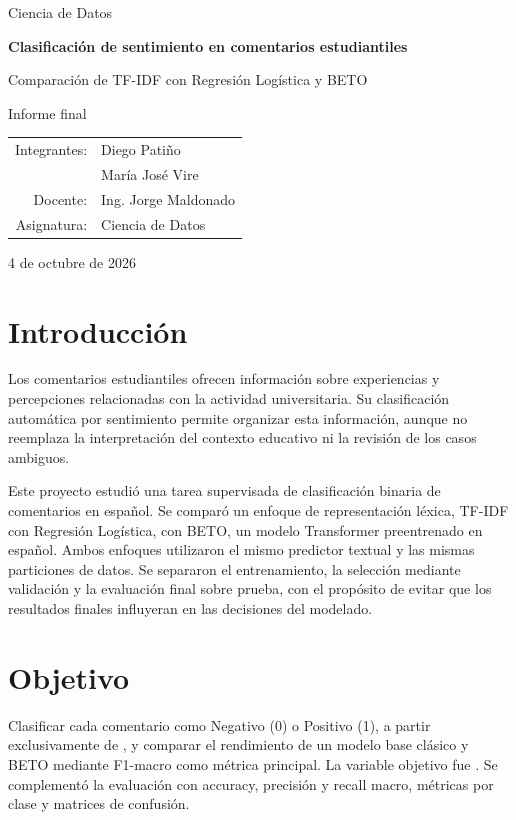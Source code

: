 \documentclass[11pt,a4paper]{article}
\newcommand{\code}[1]{\texttt{\detokenize{#1}}}
\begin{document}
\hypersetup{pageanchor=false}
\begin{titlepage}
\centering
\vspace*{2cm}
{\Large Ciencia de Datos\par}
\vspace{1.6cm}
{\LARGE\bfseries Clasificación de sentimiento en comentarios estudiantiles\par}
\vspace{0.7cm}
{\large Comparación de TF-IDF con Regresión Logística y BETO\par}
\vspace{1.5cm}
{\large Informe final\par}
\vfill
\begin{tabular}{rl}
Integrantes: & Diego Patiño\\
 & María José Vire\\[0.7em]
Docente: & Ing. Jorge Maldonado\\[0.7em]
Asignatura: & Ciencia de Datos
\end{tabular}
\vspace{1.5cm}
\par 4 de octubre de 2026
\vspace*{1cm}
\end{titlepage}
\hypersetup{pageanchor=true}

\section{Introducción}
Los comentarios estudiantiles ofrecen información sobre experiencias y percepciones
relacionadas con la actividad universitaria. Su clasificación automática por sentimiento
permite organizar esta información, aunque no reemplaza la interpretación del contexto
educativo ni la revisión de los casos ambiguos.

Este proyecto estudió una tarea supervisada de clasificación binaria de comentarios en
español. Se comparó un enfoque de representación léxica, TF-IDF con Regresión Logística,
con BETO, un modelo Transformer preentrenado en español. Ambos enfoques utilizaron el
mismo predictor textual y las mismas particiones de datos. Se separaron el entrenamiento,
la selección mediante validación y la evaluación final sobre prueba, con el propósito
de evitar que los resultados finales influyeran en las decisiones del modelado.

\section{Objetivo}
Clasificar cada comentario como Negativo (0) o Positivo (1), a partir exclusivamente de
\code{comentario_limpio}, y comparar el rendimiento de un modelo base clásico y BETO
mediante F1-macro como métrica principal. La variable objetivo fue \code{sentimiento_id}.
Se complementó la evaluación con accuracy, precisión y recall macro, métricas por clase
y matrices de confusión.
\end{document}
